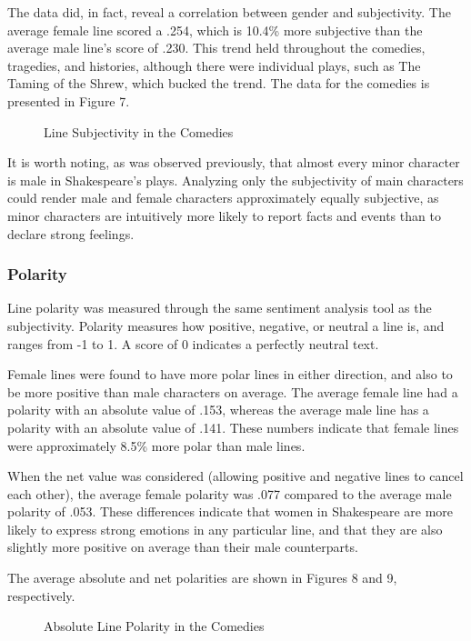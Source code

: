 \documentclass[12pt]{article} %
\begin{document}
The data did, in fact, reveal a correlation between gender and subjectivity. The average female line scored a .254, which is 10.4\% more subjective than the average male line's score of .230. This trend held throughout the comedies, tragedies, and histories, although there were individual plays, such as The Taming of the Shrew, which bucked the trend. The data for the comedies is presented in Figure 7.

\begin{figure}[H] %
\caption{Line Subjectivity in the Comedies}
\label{fig:speciation}
\end{figure}

It is worth noting, as was observed previously, that almost every minor character is male in Shakespeare's plays. Analyzing only the subjectivity of main characters could render male and female characters approximately equally subjective, as minor characters are intuitively more likely to report facts and events than to declare strong feelings.

\subsubsection{Polarity}
Line polarity was measured through the same sentiment analysis tool as the subjectivity. Polarity measures how positive, negative, or neutral a line is, and ranges from -1 to 1. A score of 0 indicates a perfectly neutral text.

Female lines were found to have more polar lines in either direction, and also to be more positive than male characters on average. The average female line had a polarity with an absolute value of .153, whereas the average male line has a polarity with an absolute value of .141. These numbers indicate that female lines were approximately 8.5\% more polar than male lines.

When the net value was considered (allowing positive and negative lines to cancel each other), the average female polarity was .077 compared to the average male polarity of .053. These differences indicate that women in Shakespeare are more likely to express strong emotions in any particular line, and that they are also slightly more positive on average than their male counterparts.

The average absolute and net polarities are shown in Figures 8 and 9, respectively.

\begin{figure}[H] %
\caption{Absolute Line Polarity in the Comedies}
\label{fig:speciation}
\end{figure}
\end{document}
